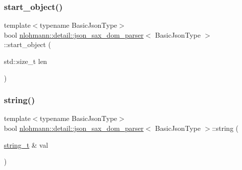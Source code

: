 \mbox{\label{classnlohmann_1_1detail_1_1json__sax__dom__parser_a9929b4cc92d471c49bd0a92802629f90}} 
\subsubsection{\texorpdfstring{start\+\_\+object()}{start\_object()}}
{\footnotesize\ttfamily template$<$typename Basic\+Json\+Type$>$ \\
bool \hyperlink{classnlohmann_1_1detail_1_1json__sax__dom__parser}{nlohmann\+::detail\+::json\+\_\+sax\+\_\+dom\+\_\+parser}$<$ Basic\+Json\+Type $>$\+::start\+\_\+object (\begin{DoxyParamCaption}\item[{std\+::size\+\_\+t}]{len }\end{DoxyParamCaption})\hspace{0.3cm}{\ttfamily [inline]}}

\mbox{\label{classnlohmann_1_1detail_1_1json__sax__dom__parser_a851d965082d20a726138f5d0330dc7d8}} 
\subsubsection{\texorpdfstring{string()}{string()}}
{\footnotesize\ttfamily template$<$typename Basic\+Json\+Type$>$ \\
bool \hyperlink{classnlohmann_1_1detail_1_1json__sax__dom__parser}{nlohmann\+::detail\+::json\+\_\+sax\+\_\+dom\+\_\+parser}$<$ Basic\+Json\+Type $>$\+::string (\begin{DoxyParamCaption}\item[{\hyperlink{classnlohmann_1_1detail_1_1json__sax__dom__parser_afd4d961ab2a6b01cbe6e840f7fb90cdc}{string\+\_\+t} \&}]{val }\end{DoxyParamCaption})\hspace{0.3cm}{\ttfamily [inline]}}



